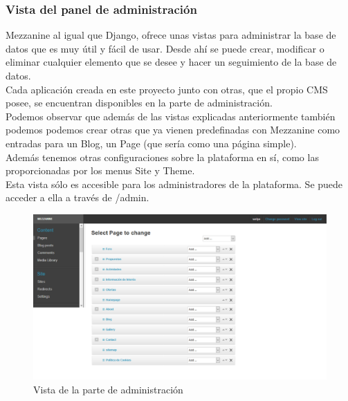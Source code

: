 \subsubsection{Vista del panel de administración}
\label{subsubsec:admin}
Mezzanine al igual que Django, ofrece unas vistas para administrar la base de datos que es muy útil y fácil de usar. Desde ahí se puede crear, modificar o eliminar cualquier elemento que se desee y hacer un seguimiento de la base de datos. \\
Cada aplicación creada en este proyecto junto con otras, que el propio CMS posee, se encuentran disponibles en la parte de administración.  \\
Podemos observar que además de las vistas explicadas anteriormente también podemos podemos crear otras que ya vienen predefinadas con Mezzanine como entradas para un Blog, un Page (que sería como una página simple).\\
Además tenemos otras configuraciones sobre la plataforma en sí, como las proporcionadas por los menus Site y Theme.\\
Esta vista sólo es accesible para los administradores de la plataforma. Se puede acceder a ella a través de /admin.
\begin{figure}[H]
   \centering
   \includegraphics[width=12cm]{img/admin}
   \caption{Vista de la parte de administración}
   \label{figura:admin}
\end{figure}